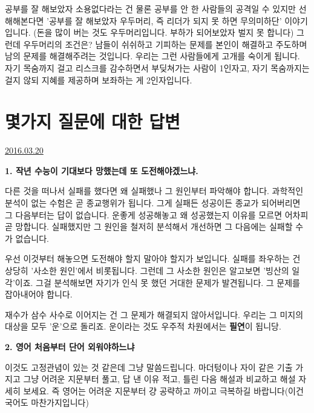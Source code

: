 공부를 잘 해보았자 소용없다라는 건 물론 공부를 안 한 사람들의 공격일 수 있지만
선해해본다면 '공부를 잘 해보았자 우두머리, 즉 리더가 되지 못 하면 무의미하단' 이야기입니다.
(돈을 많이 버는 것도 우두머리입니다. 부하가 되어보았자 벌지 못 합니다)
그런데 우두머리의 조건은?
남들이 쉬쉬하고 기피하는 문제를 본인이 해결하고 주도하며 남의 문제를 해결해주려는 것입니다.
우리는 그런 사람들에게 고개를 숙이게 됩니다.
자기 목숨까지 걸고 리스크를 감수하면서 부딪쳐가는 사람이 1인자고,
자기 목숨까지는 걸지 않되 지혜를 제공하며 보좌하는 게 2인자입니다.
\vspace{5mm}





\section{몇가지 질문에 대한 답변}
\href{https://www.kockoc.com/Apoc/685888}{2016.03.20}

\vspace{5mm}

\item \textbf{1. 작년 수능이 기대보다 망했는데 또 도전해야겠느냐.}
\vspace{5mm}

다른 것을 떠나서 실패를 했다면 왜 실패했나 그 원인부터 파악해야 합니다.
과학적인 분석이 없는 수험은 곧 종교행위가 됩니다. 그게 실패든 성공이든 종교가 되어버리면 그 다음부터는 답이 없습니다.
운좋게 성공해놓고 왜 성공했는지 이유를 모르면 어차피 곧 망합니다.
실패했지만 그 원인을 철저히 분석해서 개선하면 그 다음에는 실패할 수가 없습니다.
\vspace{5mm}

우선 이것부터 해놓으면 도전해야 할지 말아야 할지가 보입니다.
실패를 좌우하는 건 상당히 '사소한 원인'에서 비롯됩니다.
그런데 그 사소한 원인은 알고보면 '빙산의 일각'이죠. 그걸 분석해보면 자기가 인식 못 했던 거대한 문제가 발견됩니다.
그 문제를 잡아내어야 합니다.
\vspace{5mm}

재수가 삼수 사수로 이어지는 건 그 문제가 해결되지 않아서입니다. 우리는 그 미지의 대상을 모두 '운'으로 돌리죠.
운이라는 것도 우주적 차원에서는 \textbf{필연}이 됩니당.
\vspace{5mm}

\item \textbf{2. 영어 처음부터 단어 외워야하느냐}
\vspace{5mm}

이것도 고정관념이 있는 것 같은데 그냥 말씀드립니다.
마더텅이나 자이 같은 기출 가지고 그냥 어려운 지문부터 풀고, 답 낸 이유 적고, 틀린 다음 해설과 비교하고 해설 자세히 보세요.
즉 영어는 어려운 지문부터 걍 공략하고 까이고 극복하길 바랍니다(이건 국어도 마찬가지입니다)
\vspace{5mm}

